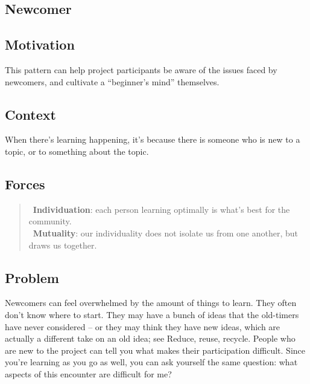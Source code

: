 \hypertarget{newcomer}{%
\subsection{Newcomer}\label{newcomer}}

\hypertarget{motivation}{%
\subsection{Motivation}\label{motivation}}

This pattern can help project participants be aware of the issues faced
by newcomers, and cultivate a ``beginner's mind'' themselves.

\hypertarget{context}{%
\subsection{Context}\label{context}}

When there's learning happening, it's because there is someone who is
new to a topic, or to something about the topic.

\hypertarget{forces}{%
\subsection{Forces}\label{forces}}

\begin{quote}
\Sindividuation\ \textbf{Individuation}: each person learning optimally is what's best for the community.\\
\Smutuality\ \textbf{Mutuality}: our individuality does not isolate us from one another, but draws us together.
\end{quote}

\hypertarget{problem}{%
\subsection{Problem}\label{problem}}

Newcomers can feel overwhelmed by the amount of things to learn. They
often don't know where to start. They may have a bunch of ideas that the
old-timers have never considered -- or they may think they have new
ideas, which are actually a different take on an old idea; see {{Reduce,
reuse, recycle}}. People who are new to the project can tell you what
makes their participation difficult. Since you're learning as you go as
well, you can ask yourself the same question: what aspects of this
encounter are difficult for me?


